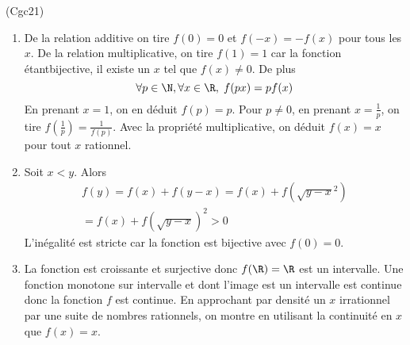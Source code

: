 \begin{tiny}(Cgc21)\end{tiny}
\begin{enumerate}
 \item De la relation additive on tire $f(0)=0$ et $f(-x) = -f(x)$ pour tous les $x$. De la relation multiplicative, on tire $f(1)=1$ car la fonction étantbijective, il existe un $x$ tel que $f(x)\neq 0$. De plus
\[
\forall p \in\N, \forall x\in \R,\; f(px) = p f(x)
\]
En prenant $x=1$, on en déduit $f(p)=p$. Pour $p\neq 0$, en prenant $x=\frac{1}{p}$, on tire $f(\frac{1}{p}) = \frac{1}{f(p)}$.\newline
Avec la propriété multiplicative, on déduit $f(x)=x$ pour tout $x$ rationnel.
 \item Soit $x < y$. Alors
\begin{multline*}
 f(y) = f(x) + f(y-x)
 = f(x) + f(\sqrt{y-x}^2)\\
 = f(x) + f(\sqrt{y-x})^2 > 0
\end{multline*}
L'inégalité est stricte car la fonction est bijective avec $f(0)=0$.
 \item La fonction est croissante et surjective donc $f(\R)=\R$ est un intervalle. Une fonction monotone sur intervalle et dont l'image est un intervalle est continue donc la fonction $f$ est continue. En approchant par densité un $x$ irrationnel par une suite de nombres rationnels, on montre en utilisant la continuité en $x$ que $f(x)=x$.
\end{enumerate}
